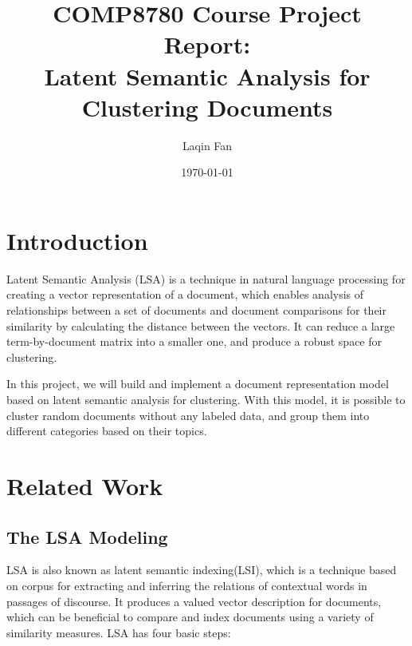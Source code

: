 \documentclass[12pt]{article}
\begin{document}
\title{COMP8780 Course Project Report:   \\  \textbf{Latent Semantic Analysis for Clustering Documents}}
\author{Laqin Fan}
\date{\today}
\maketitle


\section{Introduction}
Latent Semantic Analysis (LSA) is a technique in natural language processing for creating a vector representation of a document, which enables analysis of relationships between a set of documents and document comparisons for their similarity by calculating the distance between the vectors. It can reduce a large term-by-document matrix into a smaller one, and produce a robust space for clustering. 
\par 
In this project, we will build and implement a document representation model based on latent semantic analysis for  clustering. With this model, it is possible to cluster random documents without any labeled data, and group them into different categories based on their topics.

\section{Related Work}
\subsection{The LSA Modeling} 
\par LSA\cite{Intro} is also known as latent semantic indexing(LSI), which is a technique based on corpus for extracting and inferring the relations of contextual words in passages of discourse. It produces a valued vector description for documents, which can be beneficial to compare and index documents using a variety of similarity measures. LSA has four basic steps:
\end{document}
